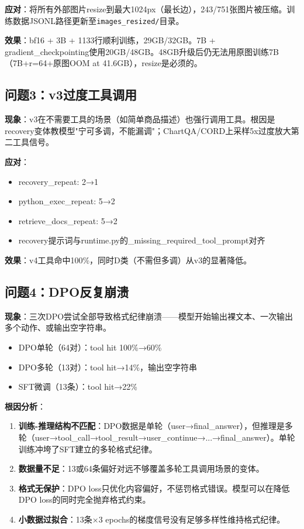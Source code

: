 \documentclass[fontset=none,11pt,a4paper]{ctexart}
\begin{document}
\textbf{应对}：将所有外部图片resize到最大1024px（最长边），243/751张图片被压缩。训练数据JSONL路径更新至\texttt{images\_resized/}目录。

\textbf{效果}：bf16 + 3B + 1133行顺利训练，29GB/32GB。7B + gradient\_checkpointing使用20GB/48GB。48GB升级后仍无法用原图训练7B（7B+r=64+原图OOM at 41.6GB），resize是必须的。

\subsection{问题3：v3过度工具调用}

\textbf{现象}：v3在不需要工具的场景（如简单商品描述）也强行调用工具。根因是recovery变体教模型"宁可多调，不能漏调"；ChartQA/CORD上采样5x过度放大第二工具信号。

\textbf{应对}：
\begin{itemize}[nosep]
    \item recovery\_repeat: 2→1
    \item python\_exec\_repeat: 5→2
    \item retrieve\_docs\_repeat: 5→2
    \item recovery提示词与runtime.py的\_missing\_required\_tool\_prompt对齐
\end{itemize}

\textbf{效果}：v4工具命中100\%，同时D类（不需但多调）从v3的显著降低。

\subsection{问题4：DPO反复崩溃}

\textbf{现象}：三次DPO尝试全部导致格式纪律崩溃------模型开始输出裸文本、一次输出多个动作、或输出空字符串。
\begin{itemize}[nosep]
    \item DPO单轮（64对）：tool hit 100\%→60\%
    \item DPO多轮（13对）：tool hit→14\%，输出空字符串
    \item SFT微调（13条）：tool hit→22\%
\end{itemize}

\textbf{根因分析}：
\begin{enumerate}[label=(\arabic*),nosep]
    \item \textbf{训练-推理结构不匹配}：DPO数据是单轮（user→final\_answer），但推理是多轮（user→tool\_call→tool\_result→user\_continue→...→final\_answer）。单轮训练冲垮了SFT建立的多轮格式纪律。
    \item \textbf{数据量不足}：13或64条偏好对远不够覆盖多轮工具调用场景的变体。
    \item \textbf{格式无保护}：DPO loss只优化内容偏好，不惩罚格式错误。模型可以在降低DPO loss的同时完全抛弃格式约束。
    \item \textbf{小数据过拟合}：13条×3 epochs的梯度信号没有足够多样性维持格式纪律。
\end{enumerate}
\end{document}
